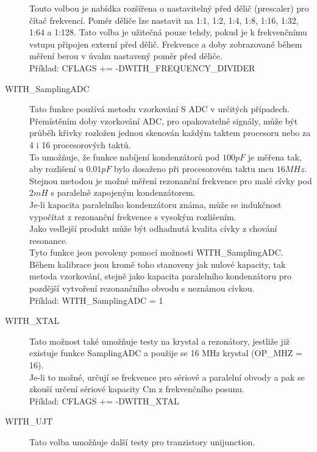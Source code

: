 \begin{description}
Touto volbou je nabídka rozšířena o nastavitelný před dělič (prescaler) pro čítač frekvencí.
Poměr děliče lze nastavit na 1:1, 1:2, 1:4, 1:8, 1:16, 1:32, 1:64 a 1:128.
Tato volba je užitečná pouze tehdy, pokud je k frekvenčnímu vstupu připojen externí před dělič.
Frekvence a doby zobrazované během měření berou v úvahu nastavený poměr před děliče.\\
Příklad: CFLAGS += -DWITH\_FREQUENCY\_DIVIDER
\vspace{-0,3cm}
  \item[WITH\_SamplingADC] Tato funkce používá metodu vzorkování S ADC v určitých případech.\\
Přemístěním doby vzorkování ADC, pro opakovatelné signály, může být průběh křivky rozložen jednou
skenován každým taktem procesoru nebo za 4 i 16 procesorových taktů.\\ To umožňuje, že funkce nabíjení 
kondenzátorů pod \(100pF\) je měřena tak, aby rozlišení u \(0.01pF\) bylo dosaženo při procesorovém taktu mcu \(16MHz\).\\
Stejnou metodou je možné měření rezonanční frekvence pro malé cívky pod \(2mH\) s paralelně zapojeným kondenzátorem.\\
Je-li kapacita paralelního kondenzátoru známa, může se indukčnost vypočítat z rezonanční
frekvence s vysokým rozlišením.\\ Jako vedlejší produkt může být odhadnutá kvalita cívky z
chování resonance.\\ Tyto funkce jsou povoleny pomocí možnosti WITH\_SamplingADC.\\
Během kalibrace jsou kromě toho stanoveny jak nulové kapacity, tak metoda vzorkování,
stejně jako kapacita paralelního kondenzátoru pro pozdější vytvoření rezonančního obvodu s neznámou cívkou.\\
Příklad: WITH\_SamplingADC = 1
\vspace{-0,3cm}
  \item[WITH\_XTAL]
Tato možnost také umožňuje testy na krystal a rezonátory, jestliže již existuje funkce SamplingADC
a použije se 16 MHz krystal (OP\_MHZ = 16).\\
Je-li to možné, určují se frekvence pro sériové a paralelní obvody a pak se zkouší
určení sériové kapacity Cm z frekvenčního posunu.\\
Příklad: CFLAGS += -DWITH\_XTAL
\vspace{-0,3cm}
  \item[WITH\_UJT]
Tato volba umožňuje další testy pro tranzistory unijunction.\\

\end{description}
